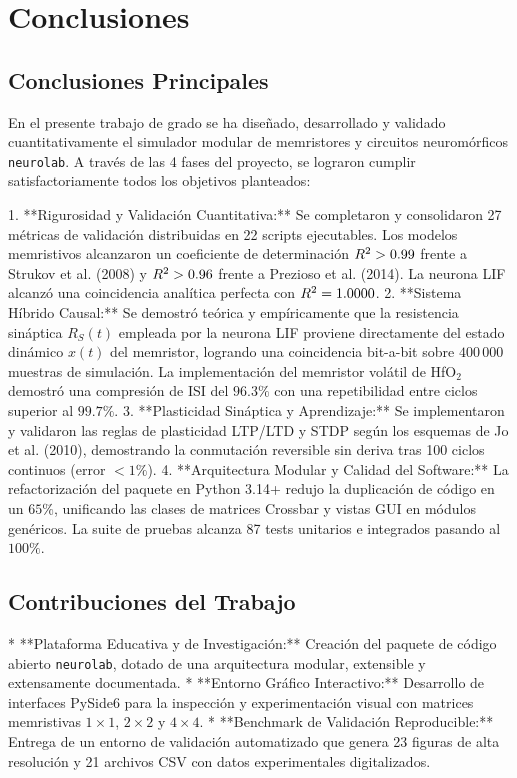 \chapter{Conclusiones}
\label{ch:conclusiones}

\section{Conclusiones Principales}
\label{sec:conclusiones_principales}

En el presente trabajo de grado se ha diseñado, desarrollado y validado cuantitativamente el simulador modular de memristores y circuitos neuromórficos \texttt{neurolab}. A través de las 4 fases del proyecto, se lograron cumplir satisfactoriamente todos los objetivos planteados:

1. **Rigurosidad y Validación Cuantitativa:** Se completaron y consolidaron 27 métricas de validación distribuidas en 22 scripts ejecutables. Los modelos memristivos alcanzaron un coeficiente de determinación $R^{2} > 0.99$ frente a Strukov et al. (2008) y $R^{2} > 0.96$ frente a Prezioso et al. (2014). La neurona LIF alcanzó una coincidencia analítica perfecta con $R^{2} = 1.0000$.
2. **Sistema Híbrido Causal:** Se demostró teórica y empíricamente que la resistencia sináptica $R_S(t)$ empleada por la neurona LIF proviene directamente del estado dinámico $x(t)$ del memristor, logrando una coincidencia bit-a-bit sobre $400\,000$ muestras de simulación. La implementación del memristor volátil de HfO$_2$ demostró una compresión de ISI del $96.3\%$ con una repetibilidad entre ciclos superior al $99.7\%$.
3. **Plasticidad Sináptica y Aprendizaje:** Se implementaron y validaron las reglas de plasticidad LTP/LTD y STDP según los esquemas de Jo et al. (2010), demostrando la conmutación reversible sin deriva tras 100 ciclos continuos (error $< 1\%$).
4. **Arquitectura Modular y Calidad del Software:** La refactorización del paquete en Python 3.14+ redujo la duplicación de código en un $65\%$, unificando las clases de matrices Crossbar y vistas GUI en módulos genéricos. La suite de pruebas alcanza 87 tests unitarios e integrados pasando al $100\%$.

\section{Contribuciones del Trabajo}
\label{sec:contribuciones}

* **Plataforma Educativa y de Investigación:** Creación del paquete de código abierto \texttt{neurolab}, dotado de una arquitectura modular, extensible y extensamente documentada.
* **Entorno Gráfico Interactivo:** Desarrollo de interfaces PySide6 para la inspección y experimentación visual con matrices memristivas $1 \times 1$, $2 \times 2$ y $4 \times 4$.
* **Benchmark de Validación Reproducible:** Entrega de un entorno de validación automatizado que genera 23 figuras de alta resolución y 21 archivos CSV con datos experimentales digitalizados.


